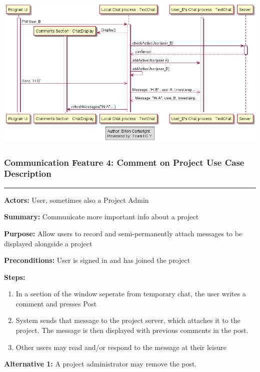 \documentclass[twoside,letterpaper]{article}
\begin{document}
\bigskip

\includegraphics[width=\textwidth]{images/SequenceDiagrams/Comms_PM}

\newpage

\subsubsection[Communication Feature 4: Comment on Project Use Case Description]{\rmfamily\bfseries\color{black}
	Communication Feature 4: Comment on Project Use Case Description}
\hypertarget{RefHeading22059017292}{}

\vspace{2pt}
\hrule
\vspace{8pt}
\textbf{Actors:} User, sometimes also a Project Admin \newline

\noindent\textbf{Summary:} Communicate more important info about a project  \newline

\noindent\textbf{Purpose:} Allow users to record and semi-permanently attach messages to be displayed alongside a project \newline

\noindent\textbf{Preconditions:} User is signed in and has joined the project \newline

\noindent\textbf{Steps:} \begin{enumerate}
	\item In a section of the window seperate from temporary chat, the user writes a comment and presses Post
	\item System sends that message to the project server, which attaches it to the project. The message is then displayed with previous comments in the post.
	\item Other users may read and/or respond to the message at their leisure
\end{enumerate}
\noindent\textbf{Alternative 1:} A project administrator may remove the post. \newline
\end{document}
